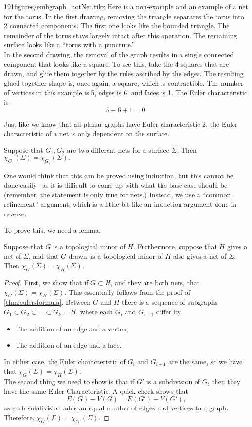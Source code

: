 \begin{examplefigureenv}{191figures/embgraph_notNet.tikz}
	Here is a non-example and an example of a net for the torus.
In the first drawing, removing the triangle separates the torus into 2 connected components. The first one looks like the bounded triangle. The remainder of the torus stays largely intact after this operation. The remaining surface looks like a ``torus with a puncture.''\\
In the second drawing, the removal of the graph results in a single connected component that looks like a square. To see this, take the 4 squares that are drawn, and glue them together by the rules ascribed by the edges. The resulting glued together shape is, once again, a square, which is contractible. The number of vertices in this example is 5, edges is 6, and faces is 1. The Euler characteristic is 
\[5-6+1=0.\]
\end{examplefigureenv}
Just like we know that all planar graphs have Euler characteristic 2, the Euler characteristic of a net is only dependent on the surface. 
\begin{theorem}
Suppose that $G_1, G_2$ are two different nets for a surface $\Sigma$. Then $\chi_{G_1}(\Sigma)=\chi_{G_2}(\Sigma).$\label{thm:eulercharacteristicsurface}
\end{theorem}
One would think that this can be proved using induction, but this cannot be done easily-- as it is difficult to come up with what the base case should be (remember, the statement is only true for nets.) Instead, we use a ``common refinement'' argument, which is a little bit like an induction argument done in reverse. 

To prove this, we need a lemma.
\begin{lemma}
Suppose that $G$ is a topological minor of $H$. Furthermore, suppose that $H$ gives a net of $\Sigma$, and that $G$ drawn as a topological minor of $H$ also gives a net of $\Sigma$. Then $\chi_G(\Sigma)=\chi_H(\Sigma)$. 
\end{lemma}
\begin{proof}
First, we show that if $G\subset H$, and they are both nets, that  $\chi_G(\Sigma)=\chi_H(\Sigma)$. This essentially follows from the proof of \ref{thm:eulersformula}. Between $G$ and $H$ there is a sequence of subgraphs $G_1\subset G_2\subset \ldots\subset  G_k=H$, where each $G_i$ and $G_{i+1}$ differ by
\begin{itemize}
\item The addition of an edge and a vertex, 
\item The addition of an edge and a face. 
\end{itemize}
In either case, the Euler characteristic of $G_i$ and $G_{i+1}$ are the same, so we have that $\chi_G(\Sigma)=\chi_H(\Sigma)$.\\
The second thing we need to show is that if $G'$ is a subdivision of $G$, then they have the same Euler Characteristic. A quick check shows that 
\[E(G)-V(G)=E(G')-V(G'),\]
as each subdivision adds an equal number of edges and vertices to a graph. Therefore, $\chi_G(\Sigma)=\chi_{G'}(\Sigma)$. 
\end{proof}

